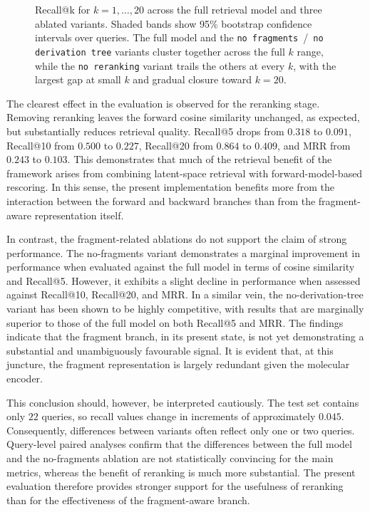 \begin{figure}[H]
    \centering
    
    \caption[Recall@k for ablation variants]{
        Recall@k for $k = 1, \ldots, 20$ across the full retrieval model and three ablated variants. 
        Shaded bands show 95\% bootstrap confidence intervals over queries. 
        The full model and the \texttt{no fragments}~/~\texttt{no derivation tree} variants 
        cluster together across the full $k$ range, 
        while the \texttt{no reranking} variant trails the others at every $k$, 
        with the largest gap at small $k$ and gradual closure toward $k = 20$.
    }
    \label{fig:recall-at-k}
\end{figure}

The clearest effect in the evaluation is observed for the reranking stage. 
Removing reranking leaves the forward cosine similarity unchanged, as expected, 
but substantially reduces retrieval quality. Recall@5 drops from $0.318$ to $0.091$, 
Recall@10 from $0.500$ to $0.227$, Recall@20 from $0.864$ to $0.409$, and MRR from $0.243$ to $0.103$. 
This demonstrates that much of the retrieval benefit of 
the framework arises from combining latent-space retrieval with forward-model-based rescoring. 
In this sense, the present implementation benefits more from the interaction between the forward 
and backward branches than from the fragment-aware representation itself.

In contrast, the fragment-related ablations do not support the claim of strong performance. 
The no-fragments variant demonstrates a marginal improvement in performance when evaluated 
against the full model in terms of cosine similarity and Recall@5. 
However, it exhibits a slight decline in performance when assessed against Recall@10, Recall@20, and MRR. 
In a similar vein, the no-derivation-tree variant has been shown to be highly competitive, 
with results that are marginally superior to those of the full model on both Recall@5 and MRR. 
The findings indicate that the fragment branch, in its present state, 
is not yet demonstrating a substantial and unambiguously favourable signal. 
It is evident that, at this juncture, the fragment representation is largely redundant given the molecular encoder.

This conclusion should, however, be interpreted cautiously. 
The test set contains only $22$ queries, so recall values change in increments of approximately $0.045$. 
Consequently, differences between variants often reflect only one or two queries. 
Query-level paired analyses confirm that the differences between the full model 
and the no-fragments ablation are not statistically convincing for the main metrics, 
whereas the benefit of reranking is much more substantial. 
The present evaluation therefore provides stronger support for the usefulness of reranking than 
for the effectiveness of the fragment-aware branch.

